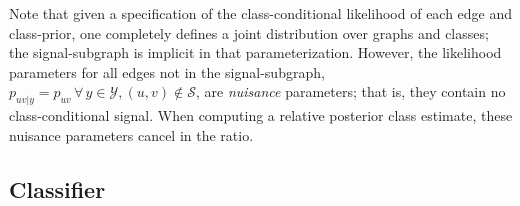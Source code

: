 \documentclass[10pt,journal,cspaper,compsoc]{IEEEtran}
\providecommand{\mc}[1]{\mathcal{#1}}
\begin{document}
Note that given a specification of the class-conditional likelihood of each edge and class-prior, one completely defines a joint distribution over graphs and classes; the signal-subgraph is implicit in that parameterization. However, the likelihood parameters for all edges not in the signal-subgraph, $p_{uv|y}=p_{uv} \, \forall \, y \in \mc{Y}, (u,v) \notin \mc{S}$,  are \emph{nuisance} parameters; that is, they contain no class-conditional signal.  When computing a relative posterior class estimate, these nuisance parameters cancel in the ratio.




\subsection{Classifier} %
\label{sub:classifier}
\end{document}
